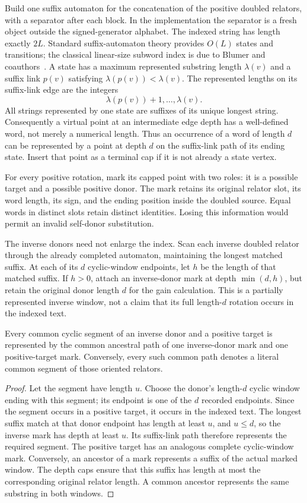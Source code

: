 Build one suffix automaton for the concatenation of the positive doubled
relators, with a separator after each block.  In the implementation the
separator is a fresh object outside the signed-generator alphabet.  The
indexed string has length exactly $2L$.  Standard suffix-automaton theory
provides $O(L)$ states and transitions; the classical linear-size subword
index is due to Blumer and coauthors~\cite{blumer}.  A state has a maximum represented
substring length $\lambda(v)$ and a suffix link $p(v)$ satisfying
$\lambda(p(v))<\lambda(v)$.  The represented lengths on its suffix-link
edge are the integers
\[
 \lambda(p(v))+1,\ldots,\lambda(v).
\]
All strings represented by one state are suffixes of its unique longest
string.  Consequently a virtual point at an intermediate edge depth has
a well-defined word, not merely a numerical length.  Thus an occurrence
of a word of length $d$ can be represented by a point
at depth $d$ on the suffix-link path of its ending state.  Insert that
point as a terminal cap if it is not already a state vertex.

For every positive rotation, mark its capped point with two roles: it is
a possible target and a possible positive donor.  The mark retains its
original relator slot, its word length, its sign, and the ending position
inside the doubled source.  Equal words in distinct slots retain distinct
identities.  Losing this information would permit an invalid self-donor
substitution.

The inverse donors need not enlarge the index.  Scan each inverse doubled
relator through the already completed automaton, maintaining the longest
matched suffix.  At each of its $d$ cyclic-window endpoints, let $h$ be
the length of that matched suffix.  If $h>0$, attach an inverse-donor mark
at depth $\min(d,h)$, but retain the original donor length $d$ for the gain
calculation.  This is a partially represented inverse window, not a claim
that its full length-$d$ rotation occurs in the indexed text.

\begin{lemma}
Every common cyclic segment of an inverse donor and a positive target is
represented by the common ancestral path of one inverse-donor mark and one
positive-target mark.  Conversely, every such common path denotes a literal
common segment of those oriented relators.
\end{lemma}
\begin{proof}
Let the segment have length $u$.  Choose the donor's length-$d$ cyclic
window ending with this segment; its endpoint is one of the $d$ recorded
endpoints.  Since the segment occurs in a positive target, it occurs in
the indexed text.  The longest suffix match at that donor endpoint has
length at least $u$, and $u\le d$, so the inverse mark has depth at least
$u$.  Its suffix-link path therefore represents the required segment.
The positive target has an analogous complete cyclic-window mark.
Conversely, an ancestor of a mark represents a suffix of the actual marked
window.  The depth caps ensure that this suffix has length at most the
corresponding original relator length.  A common ancestor represents the
same substring in both windows.
\end{proof}

